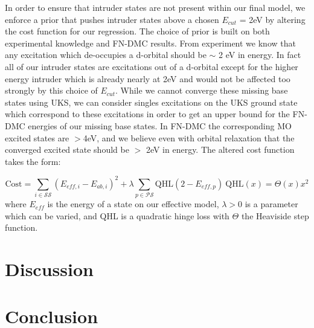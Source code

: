 \documentclass{article}
\begin{document}
In order to ensure that intruder states are not present within our final model, we enforce a prior that pushes intruder states above a chosen $E_{cut}$ = 2eV by altering the cost function for our regression. The choice of prior is built on both experimental knowledge and FN-DMC results. From experiment we know that any excitation which de-occupies a d-orbital should be $\sim$ 2 eV in energy. In fact all of our intruder states are excitations out of a d-orbital except for the higher energy intruder which is already nearly at 2eV and would not be affected too strongly by this choice of $E_{cut}$. While we cannot converge these missing base states using UKS, we can consider singles excitations on the UKS ground state which correspond to these excitations in order to get an upper bound for the FN-DMC energies of our missing base states. In FN-DMC the corresponding MO excited states are $> $4eV, and we believe even with orbital relaxation that the converged excited state should be $>$ 2eV in energy. The altered cost function takes the form:

\begin{equation}
\text{Cost} = \sum_{i \in \mathcal{SS}} (E_{eff,i} - E_{ab, i})^2 + \lambda \sum_{p \in \mathcal{PS}} \text{QHL}(2 - E_{eff,p})\ \text{QHL}(x) = \Theta(x)x^2
\end{equation}
where $E_{eff}$ is the energy of a state on our effective model, $\lambda>0$ is a parameter which can be varied, and QHL is a quadratic hinge loss with $\Theta$ the Heaviside step function. 
\section{Discussion}


\section{Conclusion}
\end{document}
